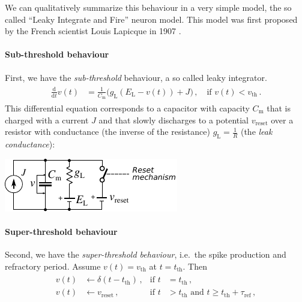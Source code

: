 \documentclass[10pt,letterpaper,oneside]{article}
\begin{document}
We can qualitatively summarize this behaviour in a very simple model, the so called \enquote{Leaky Integrate and Fire} neuron model. This model was first proposed by the French scientist Louis Lapicque in 1907 \cite{lapicque1907recherches,abbott1999lapicque}.

\paragraph{Sub-threshold behaviour}
First, we have the \emph{sub-threshold} behaviour, a so called leaky integrator.
\begin{align}
	\begin{aligned}
		\frac{\mathrm{d}}{\mathrm{d}t} v(t) &= \frac{1}{C_\mathrm{m}} \big(g_\mathrm{L} (E_\mathrm{L} - v(t))
			+ J
		\big) \,, \quad \text{if } v(t) < v_\mathrm{th}\,.
	\end{aligned}
	\label{eqn:sub-threshold}
\end{align}
This differential equation corresponds to a capacitor with capacity $C_\mathrm{m}$ that is charged with a current $J$ and that slowly discharges to a potential $v_\mathrm{reset}$ over a resistor with conductance (the inverse of the resistance) $g_\mathrm{L} = \frac{1}{R}$ (the \emph{leak conductance}):
\begin{center}
	\hspace{2.5cm}\includegraphics[scale=1.5]{media/lif_circuit.pdf}
\end{center}

\paragraph{Super-threshold behaviour}
Second, we have the \emph{super-threshold behaviour}, i.e.~the spike production and refractory period. Assume $v(t) = v_\mathrm{th}$ at $t = t_\mathrm{th}$. Then
\begin{align}
	\begin{aligned}
		v(t) &\gets \delta(t - t_\mathrm{th}) \,, &\text{if } t &= t_\mathrm{th} \,,\\
		v(t) &\gets v_\mathrm{reset} \,, &\text{if } t &> t_\mathrm{th} \text{ and } t \geq t_\mathrm{th} + \tau_\mathrm{ref} \,,
	\end{aligned}
	\label{eqn:super-threshold}
\end{align}
\end{document}
